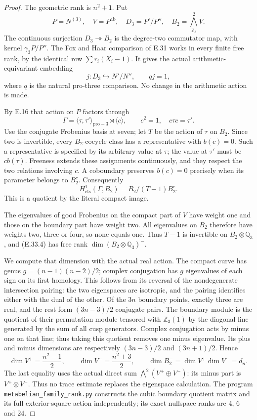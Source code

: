 \begin{proof}
The geometric rank is $n^2+1$. Put
\[
 P=N^{(3)},\quad V=P^{\mathrm{ab}},\quad
 D_3=P'/P'',\quad B_2=\bigwedge^2_{\mathbb Z_3}V.
\]
The continuous surjection $D_3\twoheadrightarrow B_2$
is the degree-two commutator map, with kernel
$\gamma_3P/P''$. The Fox and Haar comparison of E.31
works in every finite free rank, by the identical
row $\sum r_i(X_i-1)$. It gives the actual
arithmetic-equivariant embedding
\[
 j:D_3\hookrightarrow N'/N'',
 \qquad qj=1,
 \tag{E.33.2}
\]
where $q$ is the natural pro-three comparison.
No change in the arithmetic action is made.

By E.16 that action on $P$ factors through
\[
 \Gamma=\langle\tau,\tau'\rangle_{\mathrm{pro}-3}
                 \rtimes\langle c\rangle,
 \qquad c^2=1,\quad c\tau c=\tau'.
 \tag{E.33.3}
\]
Use the conjugate Frobenius basis at seven; let
$T$ be the action of $\tau$ on $B_2$. Since two is
invertible, every $B_2$-cocycle class has a
representative with $b(c)=0$. Such a representative
is specified by its arbitrary value at $\tau$;
the value at $\tau'$ must be $c b(\tau)$. Freeness
extends these assignments continuously, and they
respect the two relations involving $c$. A
coboundary preserves $b(c)=0$ precisely when its
parameter belongs to $B_2^c$. Consequently
\[
 H^1_{\mathrm{cts}}(\Gamma,B_2)
       =B_2/(T-1)B_2^c.
 \tag{E.33.4}
\]
This is a quotient by the literal compact image.

The eigenvalues of good Frobenius on the compact
part of $V$ have weight one and those on the
boundary part have weight two. All eigenvalues
on $B_2$ therefore have weights two, three or
four, so none equals one. Thus $T-1$ is invertible
on $B_2\otimes\mathbb Q_3$, and (E.33.4) has
free rank $\dim(B_2\otimes\mathbb Q_3)^-$.

We compute that dimension with the actual real
action. The compact curve has genus
$g=(n-1)(n-2)/2$; complex conjugation has
$g$ eigenvalues of each sign on its first
homology. This follows from its reversal of
the nondegenerate intersection pairing: the
two eigenspaces are isotropic, and the pairing
identifies either with the dual of the other.
Of the $3n$ boundary points, exactly three
are real, and the rest form $(3n-3)/2$
conjugate pairs. The boundary module is the
quotient of their permutation module tensored
with $\mathbb Z_3(1)$ by the diagonal line
generated by the sum of all cusp generators.
Complex conjugation acts by minus one on that
line; thus taking this quotient removes one
minus eigenvalue.
Its plus and minus dimensions are respectively
$(3n-3)/2$ and $(3n+1)/2$. Hence
\[
 \dim V^+=\frac{n^2-1}2,
 \qquad
 \dim V^-=\frac{n^2+3}2,
 \qquad
 \dim B_2^-=\dim V^+\dim V^-=d_n.
 \tag{E.33.5}
\]
The last equality uses the actual direct sum
$\bigwedge^2(V^+\oplus V^-)$: its minus part is
$V^+\otimes V^-$. Thus no trace estimate replaces
the eigenspace calculation.
The program \texttt{metabelian\_family\_rank.py}
constructs the cubic boundary quotient matrix
and its full exterior-square action independently;
its exact nullspace ranks are $4$, $6$ and $24$.


\end{proof}
